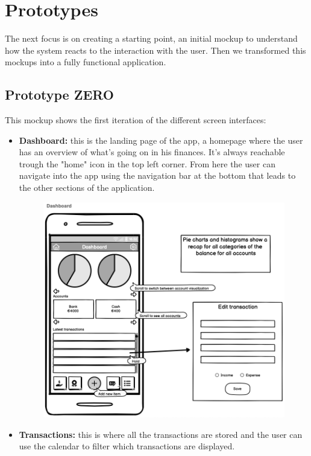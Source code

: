 \documentclass[a4paper,12pt]{article}
\begin{document}
\section{Prototypes}
The next focus is on creating a starting point, an initial mockup to understand how the system reacts to the interaction with the user. Then we transformed this mockups into a fully functional application.
\subsection{Prototype ZERO}
This mockup shows the first iteration of the different screen interfaces:
\begin{itemize}
    \item \textbf{Dashboard:} this is the landing page of the app, a homepage where the user has an overview of what's going on in his finances. It's always reachable trough the "home" icon in the top left corner. From here the user can navigate into the app using the navigation bar at the bottom that leads to the other sections of the application.
    \begin{figure}[H]
        \centering
        \includegraphics[scale = 0.4]{dashmock.png}
    \end{figure}
    \item \textbf{Transactions:} this is where all the transactions are stored and the user can use the calendar to filter which transactions are displayed.
    \begin{figure}[H]

\end{figure}
\end{itemize}
\end{document}
